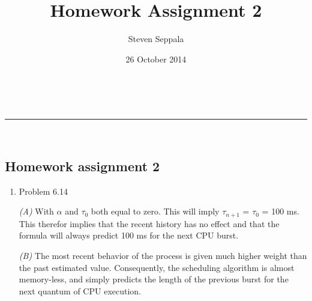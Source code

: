 \documentclass[a4paper,11pt]{article}
\makeatletter
\newcommand{\linia}{\rule{\linewidth}{0.5pt}}
\theoremstyle{mytheor}
\renewcommand{\maketitle}{
\begin{center}
\vspace{2ex}
{\huge \textsc{\@title}}
\vspace{1ex}
\\
\linia\\
\@author \hfill \@date
\vspace{4ex}
\end{center}
}
\makeatother
\begin{document}
\title{Homework Assignment \textnumero{} 2}

\author{Steven Seppala}

\date{26 October 2014}

\maketitle

\begin{center} \section*{Homework assignment 2} \end{center}

\begin{enumerate}
\item {Problem 6.14} 
    \par \emph{(A)} With $\alpha$ and $\tau _{0}$ both equal to zero. This will imply $\tau _{n+1}$ = $\tau _{0}$ = 100 ms. This therefor implies that the recent history has no effect and that the formula will always predict 100 ms for the next CPU burst.
    \par \emph{(B)} The most recent behavior of the process is given much higher weight than the past estimated value. Consequently, the scheduling algorithm is almost memory-less, and simply predicts the length of the previous burst for the next quantum of CPU execution.
    

\end{enumerate}
\end{document}
